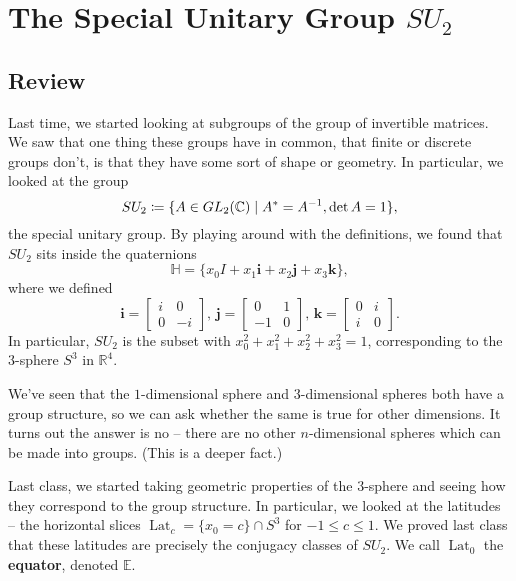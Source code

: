 
\section{The Special Unitary Group \texorpdfstring{$SU_2$}{SU2}}

\subsection{Review}

Last time, we started looking at subgroups of the group of invertible matrices. We saw that one thing these groups have in common, that finite or discrete groups don't, is that they have some sort of shape or geometry. In particular, we looked at the group \[SU_2 \coloneqq \{A \in GL_2(\mathbb C) \mid A^* = A^{-1}, \det A = 1\},\] the special unitary group. By playing around with the definitions, we found that $SU_2$ sits inside the quaternions \[\mathbb{H} = \{x_0I + x_1\mathbf{i} + x_2\mathbf{j} + x_3\mathbf{k}\},\] where we defined \[ \mathbf{i} = \begin{bmatrix} i & 0 \\ 0 & -i \end{bmatrix}, \, \mathbf{j} = \begin{bmatrix}0 & 1 \\ -1 & 0 \end{bmatrix}, \, \mathbf{k} = \begin{bmatrix} 0 & i \\ i & 0 \end{bmatrix} . \] In particular, $SU_2$ is the subset with $x_0^2 + x_1^2 + x_2^2 + x_3^2 = 1$, corresponding to the $3$-sphere $S^3$ in $\mathbb{R}^4$. 

\begin{note}
We've seen that the $1$-dimensional sphere and $3$-dimensional spheres both have a group structure, so we can ask whether the same is true for other dimensions. It turns out the answer is no -- there are no other $n$-dimensional spheres which can be made into groups. (This is a deeper fact.)
\end{note}

Last class, we started taking geometric properties of the $3$-sphere and seeing how they correspond to the group structure. In particular, we looked at the latitudes -- the horizontal slices $\operatorname{Lat}_c = \{x_0 = c\} \cap S^3$ for $-1 \leq c \leq 1$. We proved last class that these latitudes are precisely the conjugacy classes of $SU_2$. We call $\operatorname{Lat}_0$ the \textbf{equator}, denoted $\mathbb{E}$. 

